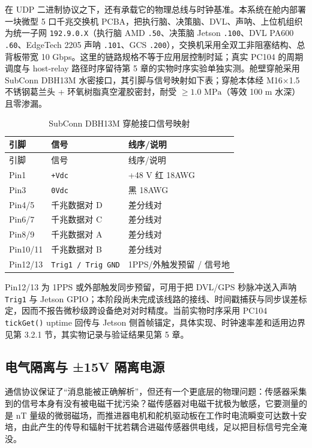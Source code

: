 在 UDP 二进制协议之下，还有承载它的物理总线与时钟基准。本系统在舱内部署一块微型 5 口千兆交换机 PCBA，把执行脑、决策脑、DVL、声呐、上位机组织为统一子网 \texttt{192.9.0.X}（执行脑 AMD \texttt{.50}、决策脑 Jetson \texttt{.100}、DVL PA600 \texttt{.60}、EdgeTech 2205 声呐 \texttt{.101}、GCS \texttt{.200}），交换机采用全双工非阻塞结构、总背板带宽 10 Gbps。这里的链路规格不等于应用层控制时延；真实 PC104 的周期调度与 host-relay 路径时序留待第 5 章的实物时序实验单独实测。舱壁穿舱采用 SubConn DBH13M 水密接口，其引脚与信号映射如下表；穿舱本体经 M16×1.5 不锈钢葛兰头 + 环氧树脂真空灌胶密封，耐受 \(\geq 1.0\text{ MPa}\)（等效 100 m 水深）且零渗漏。

\begin{longtable}[]{@{}lll@{}}
\caption{SubConn DBH13M 穿舱接口信号映射}\label{tab:ch02-subconn}\tabularnewline
\toprule\noalign{}
引脚 & 信号 & 线序/说明 \\
\midrule\noalign{}
\endfirsthead
\toprule\noalign{}
引脚 & 信号 & 线序/说明 \\
\midrule\noalign{}
\endhead
\bottomrule\noalign{}
\endlastfoot
Pin1 & \texttt{+Vdc} & +48 V 红 18AWG \\
Pin3 & \texttt{0Vdc} & 黑 18AWG \\
Pin4/5 & 千兆数据对 D & 差分线对 \\
Pin6/7 & 千兆数据对 C & 差分线对 \\
Pin8/9 & 千兆数据对 A & 差分线对 \\
Pin10/11 & 千兆数据对 B & 差分线对 \\
Pin12/13 & \texttt{Trig1\ /\allowbreak{}\ Trig\ GND} & 1PPS/外触发预留 / 信号地 \\
\end{longtable}

Pin12/13 为 1PPS 或外部触发同步预留，可用于把 DVL/GPS 秒脉冲送入声呐 \texttt{Trig1} 与 Jetson GPIO；本阶段尚未完成该线路的接线、时间戳捕获与同步误差标定，因而不报告微秒级跨设备绝对对时精度。当前实物时序采用 PC104 \texttt{tickGet()} uptime 回传与 Jetson 侧首帧锚定，具体实现、时钟速率差和适用边界见第 3.2.1 节，其实物记录与验证结果见第 5 章。

\subsection{电气隔离与 ±15V 隔离电源}\label{sec:ch02-2-5-2}

通信协议保证了``消息能被正确解析''，但还有一个更底层的物理问题：传感器采集到的信号本身有没有被电磁干扰污染？磁传感器对电磁干扰极为敏感，它要测量的是 nT 量级的微弱磁场，而推进器电机和舵机驱动板在工作时电流瞬变可达数十安培，由此产生的传导和辐射干扰若耦合进磁传感器供电线，足以把目标信号完全淹没。

